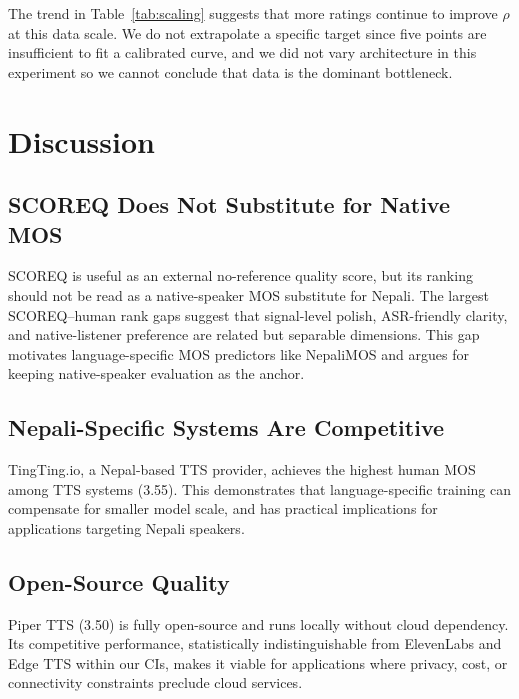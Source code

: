 \documentclass[11pt]{article}
\begin{document}
The trend in Table~\ref{tab:scaling} suggests that more ratings continue to improve $\rho$ at this data scale. We do not extrapolate a specific target since five points are insufficient to fit a calibrated curve, and we did not vary architecture in this experiment so we cannot conclude that data is the dominant bottleneck.

\section{Discussion}

\subsection{SCOREQ Does Not Substitute for Native MOS}
\label{sec:scoreq-unreliable-anchor}
SCOREQ is useful as an external no-reference quality score, but its ranking should not be read as a native-speaker MOS substitute for Nepali. The largest SCOREQ--human rank gaps suggest that signal-level polish, ASR-friendly clarity, and native-listener preference are related but separable dimensions. This gap motivates language-specific MOS predictors like NepaliMOS and argues for keeping native-speaker evaluation as the anchor.

\subsection{Nepali-Specific Systems Are Competitive}
TingTing.io, a Nepal-based TTS provider, achieves the highest human MOS among TTS systems (3.55). This demonstrates that language-specific training can compensate for smaller model scale, and has practical implications for applications targeting Nepali speakers.

\subsection{Open-Source Quality}
Piper TTS (3.50) is fully open-source and runs locally without cloud dependency. Its competitive performance, statistically indistinguishable from ElevenLabs and Edge TTS within our CIs, makes it viable for applications where privacy, cost, or connectivity constraints preclude cloud services.
\end{document}
